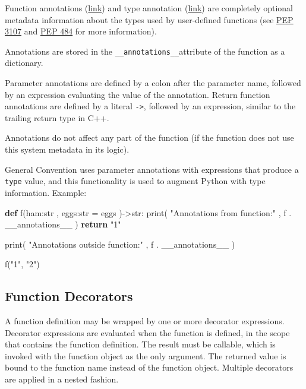 \documentclass[
]{article}
\newenvironment{Shaded}{}{}
\newcommand{\BuiltInTok}[1]{#1}
\newcommand{\ControlFlowTok}[1]{\textcolor[rgb]{0.00,0.44,0.13}{\textbf{#1}}}
\newcommand{\KeywordTok}[1]{\textcolor[rgb]{0.00,0.44,0.13}{\textbf{#1}}}
\newcommand{\NormalTok}[1]{#1}
\newcommand{\OperatorTok}[1]{\textcolor[rgb]{0.40,0.40,0.40}{#1}}
\newcommand{\StringTok}[1]{\textcolor[rgb]{0.25,0.44,0.63}{#1}}
\begin{document}
Function annotations
(\href{https://docs.python.org/3/tutorial/controlflow.html\#function-annotations}{link})
and type annotation
(\href{https://docs.python.org/3/library/typing.html}{link}) are
completely optional metadata information about the types used by
user-defined functions (see \href{https://peps.python.org/pep-3107/}{PEP
3107} and \href{https://peps.python.org/pep-0484/}{PEP 484} for more
information).

Annotations are stored in the \texttt{\_\_annotations\_\_}attribute of
the function as a dictionary.

Parameter annotations are defined by a colon after the parameter name,
followed by an expression evaluating the value of the annotation. Return
function annotations are defined by a literal \texttt{-\textgreater{}},
followed by an expression, similar to the trailing return type in C++.

Annotations do not affect any part of the function (if the function does
not use this system metadata in its logic).

General Convention uses parameter annotations with expressions that
produce a \texttt{type} value, and this functionality is used to augment
Python with type information. Example:

\begin{Shaded}
\begin{Highlighting}[]
\KeywordTok{def}\NormalTok{ f(ham:}\BuiltInTok{str}\NormalTok{ , eggs:}\BuiltInTok{str}  \OperatorTok{=}  \StringTok{\textquotesingle{}eggs\textquotesingle{}}\NormalTok{ )}\OperatorTok{{-}\textgreater{}}\BuiltInTok{str}\NormalTok{: }
    \BuiltInTok{print}\NormalTok{( }\StringTok{"Annotations from function:"}\NormalTok{ , f . \_\_annotations\_\_ )}
    \ControlFlowTok{return} \StringTok{"1"}

\BuiltInTok{print}\NormalTok{( }\StringTok{"Annotations outside function:"}\NormalTok{ , f . \_\_annotations\_\_ )}

\NormalTok{f(}\StringTok{"1"}\NormalTok{, }\StringTok{"2"}\NormalTok{)}
\end{Highlighting}
\end{Shaded}

\hypertarget{function-decorators}{%
\subsection{Function Decorators}\label{function-decorators}}

A function definition may be wrapped by one or more decorator
expressions. Decorator expressions are evaluated when the function is
defined, in the scope that contains the function definition. The result
must be callable, which is invoked with the function object as the only
argument. The returned value is bound to the function name instead of
the function object. Multiple decorators are applied in a nested
fashion.
\end{document}
